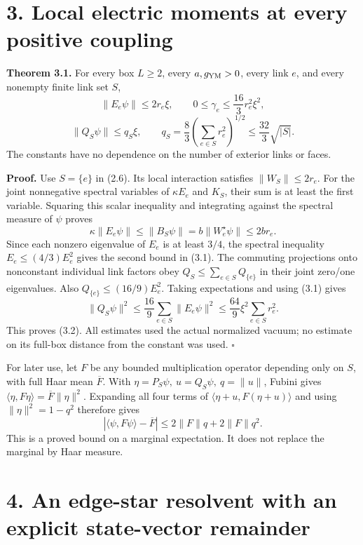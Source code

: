 \documentclass[
]{article}
\begin{document}
\section{3. Local electric moments at every positive
coupling}\label{local-electric-moments-at-every-positive-coupling}

\textbf{Theorem 3.1.} For every box \(L\ge2\), every \(a,g_{\rm YM}>0\),
every link \(e\), and every nonempty finite link set \(S\), \[
\|E_e\psi\|\le2r_e\xi,\qquad
0\le\gamma_e\le\frac{16}{3}r_e^2\xi^2,                         \tag{3.1}
\] \[
\|Q_S\psi\|\le q_S\xi,\qquad
q_S=\frac83\left(\sum_{e\in S}r_e^2\right)^{1/2}
\le\frac{32}{3}\sqrt{|S|}.                                    \tag{3.2}
\] The constants have no dependence on the number of exterior links or
faces.

\textbf{Proof.} Use \(S=\{e\}\) in (2.6). Its local interaction
satisfies \(\|W_S\|\le2r_e\). For the joint nonnegative spectral
variables of \(\kappa E_e\) and \(K_S\), their sum is at least the first
variable. Squaring this scalar inequality and integrating against the
spectral measure of \(\psi\) proves \[
\kappa\|E_e\psi\|\le\|B_S\psi\|
 =b\|W_e^{\star}\psi\|\le2br_e.
\] Since each nonzero eigenvalue of \(E_e\) is at least \(3/4\), the
spectral inequality \(E_e\le(4/3)E_e^2\) gives the second bound in
(3.1). The commuting projections onto nonconstant individual link
factors obey \(Q_S\le\sum_{e\in S}Q_{\{e\}}\) in their joint zero/one
eigenvalues. Also \(Q_{\{e\}}\le(16/9)E_e^2\). Taking expectations and
using (3.1) gives \[
\|Q_S\psi\|^2\le\frac{16}{9}\sum_{e\in S}\|E_e\psi\|^2
 \le\frac{64}{9}\xi^2\sum_{e\in S}r_e^2.
\] This proves (3.2). All estimates used the actual normalized vacuum;
no estimate on its full-box distance from the constant was used.
\(\square\)

For later use, let \(F\) be any bounded multiplication operator
depending only on \(S\), with full Haar mean \(\overline F\). With
\(\eta=P_S\psi,\ u=Q_S\psi,\ q=\|u\|\), Fubini gives
\(\langle\eta,F\eta\rangle=\overline F\|\eta\|^2\). Expanding all four
terms of \(\langle\eta+u,F(\eta+u)\rangle\) and using
\(\|\eta\|^2=1-q^2\) therefore gives \[
\left|\langle\psi,F\psi\rangle-\overline F\right|
 \le2\|F\|q+2\|F\|q^2.                                      \tag{3.3}
\] This is a proved bound on a marginal expectation. It does not replace
the marginal by Haar measure.

\section{4. An edge-star resolvent with an explicit state-vector
remainder}\label{an-edge-star-resolvent-with-an-explicit-state-vector-remainder}
\end{document}
